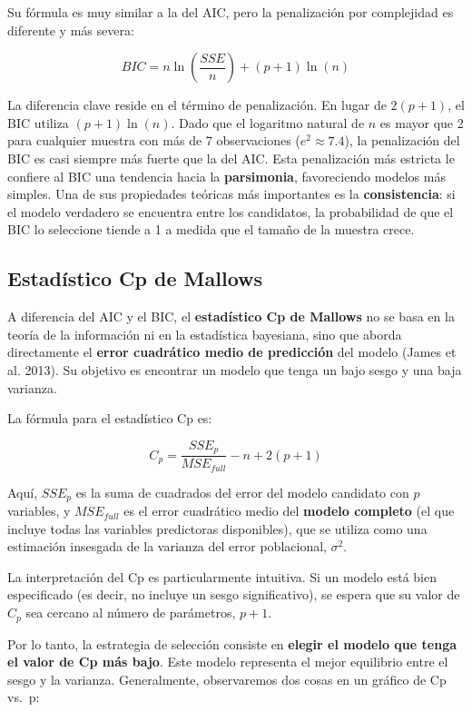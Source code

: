 \documentclass[
  letterpaper,
  DIV=11,
  numbers=noendperiod]{scrreprt}
\begin{document}
Su fórmula es muy similar a la del AIC, pero la penalización por
complejidad es diferente y más severa:

\[BIC = n \ln\left(\frac{SSE}{n}\right) + (p+1) \ln(n)\]

La diferencia clave reside en el término de penalización. En lugar de
\(2(p+1)\), el BIC utiliza \((p+1)\ln(n)\). Dado que el logaritmo
natural de \(n\) es mayor que 2 para cualquier muestra con más de 7
observaciones (\(e^2 \approx 7.4\)), la penalización del BIC es casi
siempre más fuerte que la del AIC. Esta penalización más estricta le
confiere al BIC una tendencia hacia la \textbf{parsimonia}, favoreciendo
modelos más simples. Una de sus propiedades teóricas más importantes es
la \textbf{consistencia}: si el modelo verdadero se encuentra entre los
candidatos, la probabilidad de que el BIC lo seleccione tiende a 1 a
medida que el tamaño de la muestra crece.

\subsection{Estadístico Cp de
Mallows}\label{estaduxedstico-cp-de-mallows}

A diferencia del AIC y el BIC, el \textbf{estadístico Cp de Mallows} no
se basa en la teoría de la información ni en la estadística bayesiana,
sino que aborda directamente el \textbf{error cuadrático medio de
predicción} del modelo (James et al. 2013). Su objetivo es encontrar un
modelo que tenga un bajo sesgo y una baja varianza.

La fórmula para el estadístico Cp es:

\[C_p = \frac{SSE_p}{MSE_{full}} - n + 2(p+1)\]

Aquí, \(SSE_p\) es la suma de cuadrados del error del modelo candidato
con \(p\) variables, y \(MSE_{full}\) es el error cuadrático medio del
\textbf{modelo completo} (el que incluye todas las variables predictoras
disponibles), que se utiliza como una estimación insesgada de la
varianza del error poblacional, \(\sigma^2\).

La interpretación del Cp es particularmente intuitiva. Si un modelo está
bien especificado (es decir, no incluye un sesgo significativo), se
espera que su valor de \(C_p\) sea cercano al número de parámetros,
\(p+1\).

Por lo tanto, la estrategia de selección consiste en \textbf{elegir el
modelo que tenga el valor de Cp más bajo}. Este modelo representa el
mejor equilibrio entre el sesgo y la varianza. Generalmente,
observaremos dos cosas en un gráfico de Cp vs.~p:
\end{document}
